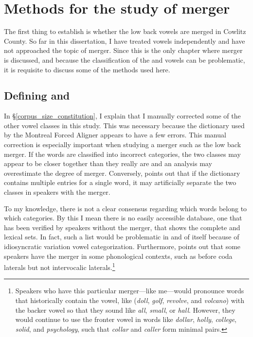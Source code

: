 \section{Methods for the study of merger}
\label{low_back_merger_methods}

The first thing to establish is whether the low back vowels are merged in Cowlitz County. So far in this dissertation, I have treated vowels independently and have not approached the topic of merger. Since this is the only chapter where merger is discussed, and because the classification of the \lot and \thought vowels can be problematic, it is requisite to discuss some of the methods used here.

\subsection{Defining \lot and \thought}

In \S\ref{corpus_size_constitution}, I explain that I manually corrected some of the other vowel classes in this study. This was necessary because the dictionary used by the Montreal Forced Aligner appears to have a few errors. This manual correction is especially important when studying a merger such as the low back merger. If the words are classified into incorrect categories, the two classes may appear to be closer together than they really are and an analysis may overestimate the degree of merger. Conversely, \citet[39]{strelluf_2019} points out that if the dictionary contains multiple entries for a single word, it may artificially separate the two classes in speakers with the merger.

To my knowledge, there is not a clear consensus regarding which words belong to which categories. By this I mean there is no easily accessible database, one that has been verified by speakers without the merger, that shows the complete \lot and \thought lexical sets. In fact, such a list would be problematic in and of itself because of idiosyncratic variation vowel categorization. Furthermore, \citet{dinkin_2016} points out that some speakers have the merger in some phonological contexts, such as before coda laterals but not intervocalic laterals.\footnote{Speakers who have this particular merger---like me---would pronounce words that historically contain the \lot vowel, like (\textit{doll}, \textit{golf}, \textit{revolve}, and \textit{volcano}) with the backer \thought vowel so that they sound like \textit{all}, \textit{small}, or \textit{hall}. However, they would continue to use the fronter vowel in words like \textit{dollar}, \textit{holly}, \textit{college}, \textit{solid}, and \textit{psychology}, such that \textit{collar} and \textit{caller} form minimal pairs.}

